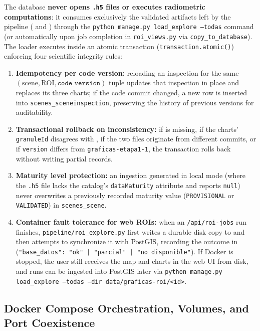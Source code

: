 \documentclass[11pt,a4paper]{article}
\newcommand{\src}[1]{\nolinkurl{#1}}
\begin{document}
The database \textbf{never opens \texttt{.h5} files or executes radiometric computations}: it consumes exclusively
the validated artifacts left by the pipeline ( and ) through the
\texttt{python manage.py load\_explore --todas} command (or automatically upon job completion in
\src{roi\_views.py} via \texttt{copy\_to\_database}). The loader executes inside an atomic transaction
(\texttt{transaction.atomic()}) enforcing four scientific integrity rules:
\begin{enumerate}
  \item \textbf{Idempotency per code version:} reloading an inspection for the same
        $(\text{scene}, \text{ROI}, \texttt{code\_version})$ tuple updates that inspection in place and replaces
        its three charts; if the code commit changed, a new row is inserted into \texttt{scenes\_sceneinspection},
        preserving the history of previous versions for auditability.
  \item \textbf{Transactional rollback on inconsistency:} if  is missing, if the charts'
        \texttt{granuleId} disagrees with , if the two files originate from different commits,
        or if \texttt{version} differs from \texttt{graficas-etapa1-1}, the transaction rolls back without writing
        partial records.
  \item \textbf{Maturity level protection:} an ingestion generated in local mode (where the \texttt{.h5} file
        lacks the catalog's \texttt{dataMaturity} attribute and reports \texttt{null}) never overwrites a
        previously recorded maturity value (\texttt{PROVISIONAL} or \texttt{VALIDATED}) in \texttt{scenes\_scene}.
  \item \textbf{Container fault tolerance for web ROIs:} when an \texttt{/api/roi-jobs} run finishes,
        \src{pipeline/roi\_explore.py} first writes a durable disk copy to  and
        then attempts to synchronize it with PostGIS, recording the outcome in 
        (\texttt{"base\_datos": "ok" | "parcial" | "no disponible"}). If Docker is stopped, the user still
        receives the map and charts in the web UI from disk, and runs can be ingested into PostGIS later via
        \texttt{python manage.py load\_explore --todas --dir data/graficas-roi/<id>}.
\end{enumerate}

\subsection{Docker Compose Orchestration, Volumes, and Port Coexistence}
\end{document}
